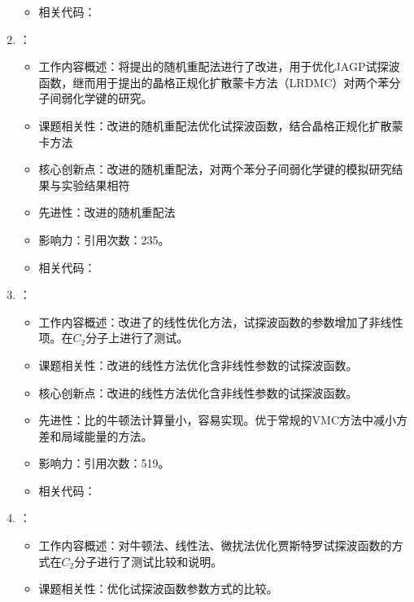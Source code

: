 \begin{enumerate}
\begin{itemize}
                \item 相关代码：
            \end{itemize}
        \item \citet{sorella2007weak}：
            \begin{itemize}
                \item 工作内容概述：将\citet{sorella2001generalized}提出的随机重配法进行了改进，用于优化JAGP试探波函数，继而用于\citet{casula2005diffusion}提出的晶格正规化扩散蒙卡方法（LRDMC）对两个苯分子间弱化学键的研究。
                \item 课题相关性：改进的随机重配法优化试探波函数，结合晶格正规化扩散蒙卡方法
                \item 核心创新点：改进的随机重配法，对两个苯分子间弱化学键的模拟研究结果与实验结果相符
                \item 先进性：改进的随机重配法
                \item 影响力：引用次数：235。
                \item 相关代码：
            \end{itemize}
        \item \citet{umrigar2007alleviation}：
            \begin{itemize}
                \item 工作内容概述：改进了\citet{nightingale2001optimization}的线性优化方法，试探波函数的参数增加了非线性项。在$C_2$分子上进行了测试。
                \item 课题相关性：改进的线性方法优化含非线性参数的试探波函数。
                \item 核心创新点：改进的线性方法优化含非线性参数的试探波函数。
                \item 先进性：比\citet{umrigar2005energy}的牛顿法计算量小，容易实现。优于常规的VMC方法中减小方差和局域能量的方法。
                \item 影响力：引用次数：519。
                \item 相关代码：
            \end{itemize}
        \item \citet{toulouse2007optimization}：
            \begin{itemize}
                \item 工作内容概述：对牛顿法\citep{umrigar2005energy}、线性法\citep{umrigar2007alleviation}、微扰法\citep{scemama2006simple}优化贾斯特罗试探波函数的方式在$C_2$分子进行了测试比较和说明。
                \item 课题相关性：优化试探波函数参数方式的比较。

\end{itemize}
\end{enumerate}
